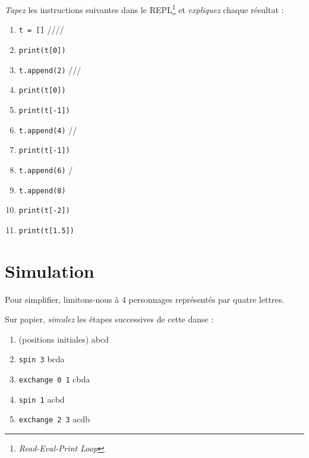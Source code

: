 \begin{exo}
\emph{Tapez} les instructions suivantes dans le
REPL\footnote{\emph{Read-Eval-Print Loop}} et
\emph{expliquez} chaque résultat :
\begin{enumerate}
	\item \texttt{t = []} 
		\dotfill \boxes ////
	\item \texttt{print(t[0])} 
		\dotfill
	\item \texttt{t.append(2)}
		\dotfill {}///
	\item \texttt{print(t[0])} 
		\dotfill
	\item \texttt{print(t[-1])} 
		\dotfill
	\item \texttt{t.append(4)}
		\dotfill {}//
	\item \texttt{print(t[-1])} 
		\dotfill
	\item \texttt{t.append(6)}
		\dotfill {}/
	\item \texttt{t.append(8)}
		\dotfill {}
	\item \texttt{print(t[-2])} 
		\dotfill
	\item \texttt{print(t[1.5])} 
		\dotfill
\end{enumerate}
\end{exo}

\section{Simulation}
Pour simplifier, limitons-nous à 4 personnages
représentés par quatre lettres.

\begin{exo}\label{ex:sim}
Sur papier, \emph{simulez} les étapes successives de cette danse :
	\begin{enumerate}%
	\item (positions initiales) \hfill \boxes abcd
	\item \texttt{spin 3} \hfill \boxes bcda
	\item \texttt{exchange 0 1} \hfill \boxes cbda
	\item \texttt{spin 1} \hfill \boxes acbd
	\item \texttt{exchange 2 3} \hfill \boxes acdb
	\end{enumerate}
\end{exo}

